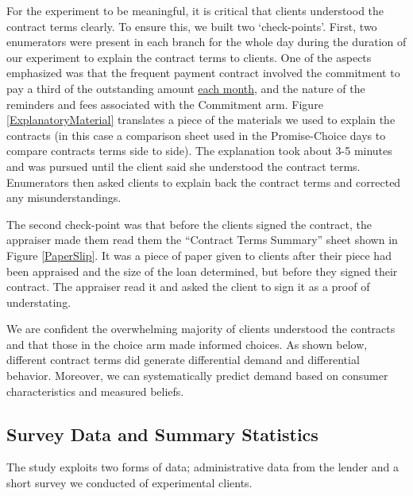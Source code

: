 \documentclass[oneside,11pt]{article}
\begin{document}
For the experiment to be meaningful, it is critical that clients understood the contract terms clearly.  To ensure this, we built two `check-points'.  First, two enumerators were present in each branch for the whole day during the duration of our experiment to explain the contract terms to clients. One of the aspects emphasized was that the frequent payment contract involved the commitment to pay a third of the outstanding amount \underline{each month}, and the nature of the reminders and fees associated with the Commitment arm.  Figure \ref{ExplanatoryMaterial} translates a piece of the materials we used to explain the contracts (in this case a comparison sheet used in the Promise-Choice days to compare contracts terms side to side). The explanation took about 3-5 minutes and was pursued until the client said she understood the contract terms. Enumerators then asked clients to explain back the contract terms and corrected any misunderstandings. 

The second check-point was that before the clients signed the contract, the appraiser made them read them the ``Contract Terms Summary'' sheet shown in Figure \ref{PaperSlip}. It was a piece of paper given to clients after their piece had been appraised and the size of the loan determined, but before they signed their contract. The appraiser read it and asked the client to sign it as a proof of understating. %

We are confident the overwhelming majority of clients understood the contracts and that those in the choice arm made informed choices. As shown below, different contract terms did generate differential demand and differential behavior. Moreover, we can systematically predict demand based on consumer characteristics and measured beliefs.






\subsection{Survey Data and Summary Statistics}

The study exploits two forms of data; administrative data from the lender and a short survey we conducted of experimental clients.  
\end{document}
